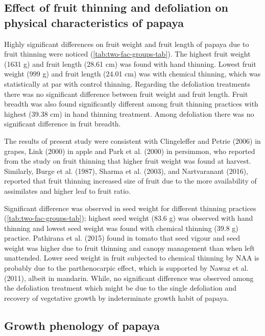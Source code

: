 \documentclass[]{article}
\begin{document}
\subsection{Effect of fruit thinning and defoliation on physical
characteristics of
papaya}\label{effect-of-fruit-thinning-and-defoliation-on-physical-characteristics-of-papaya}

Highly significant differences on fruit weight and fruit length of
papaya due to fruit thinning were noticed
(\ref{tab:two-fac-groups-tab}). The highest fruit weight (1631 g) and
fruit length (28.61 cm) was found with hand thinning. Lowest fruit
weight (999 g) and fruit length (24.01 cm) was with chemical thinning,
which was statistically at par with control thinning. Regarding the
defoliation treatments there was no significant difference between fruit
weight and fruit length. Fruit breadth was also found significantly
different among fruit thinning practices with highest (39.38 cm) in hand
thinning treatment. Among defoliation there was no significant
difference in fruit breadth.

The results of present study were consistent with Clingeleffer and
Petrie (2006) in grapes, Link (2000) in apple and Park et al. (2000) in
persimmon, who reported from the study on fruit thinning that higher
fruit weight was found at harvest. Similarly, Burge et al. (1987),
Sharma et al. (2003), and Nartvaranant (2016), reported that fruit
thinning increased size of fruit due to the more availability of
assimilates and higher leaf to fruit ratio.

Significant difference was observed in seed weight for different
thinning practices (\ref{tab:two-fac-groups-tab}); highest seed weight
(83.6 g) was observed with hand thinning and lowest seed weight was
found with chemical thinning (39.8 g) practice. Pathirana et al. (2015)
found in tomato that seed vigour and seed weight was higher due to fruit
thinning and canopy management than when left unattended. Lower seed
weight in fruit subjected to chemical thinning by NAA is probably due to
the parthenocarpic effect, which is supported by Nawaz et al. (2011),
albeit in mandarin. While, no significant difference was observed among
the defoliation treatment which might be due to the single defoliation
and recovery of vegetative growth by indeterminate growth habit of
papaya.

\subsection{Growth phenology of
papaya}\label{growth-phenology-of-papaya}
\end{document}
